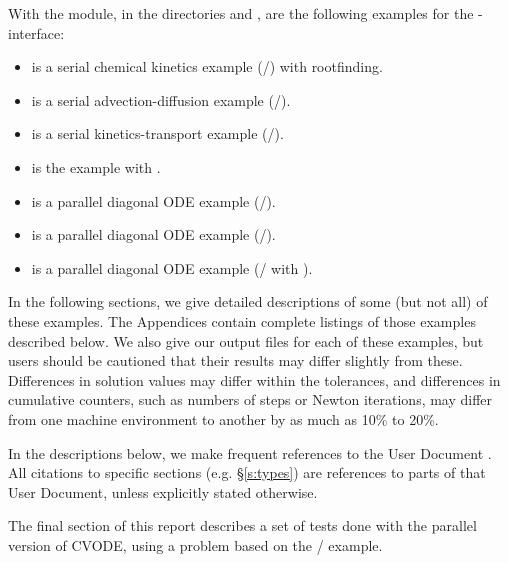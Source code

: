 With the {\fcvode} module, in the directories 
 and
, are the following examples for
the {\F}-{\C} interface:
\begin{itemize}
\item {} is a serial chemical kinetics example (/{\dense})
       with rootfinding.
\item {} is a serial advection-diffusion example (/{\band}).
\item {} is a serial kinetics-transport example (/{\spgmr}).
\item {} is the  example with {\fcvbp}.
\item {} is a parallel diagonal ODE example
       (/).
\item {} is a parallel diagonal ODE example (/{\spgmr}).
\item {} is a parallel diagonal ODE example (/{\spgmr} with 
  {\fcvbbd}).
\end{itemize}

In the following sections, we give detailed descriptions of some (but
not all) of these examples.  The Appendices contain complete listings
of those examples described below.  We also give our output files for
each of these examples, but users should be cautioned that their
results may differ slightly from these.  Differences in solution
values may differ within the tolerances, and differences in cumulative
counters, such as numbers of steps or Newton iterations, may differ
from one machine environment to another by as much as 10\% to 20\%.

In the descriptions below, we make frequent references to the {\cvode}
User Document \cite{cvode2.2.0_ug}.  All citations to specific sections
(e.g. \S\ref{s:types}) are references to parts of that User Document, unless
explicitly stated otherwise.

The final section of this report describes a set of tests done with the
parallel version of CVODE, using a problem based on the /
example.
